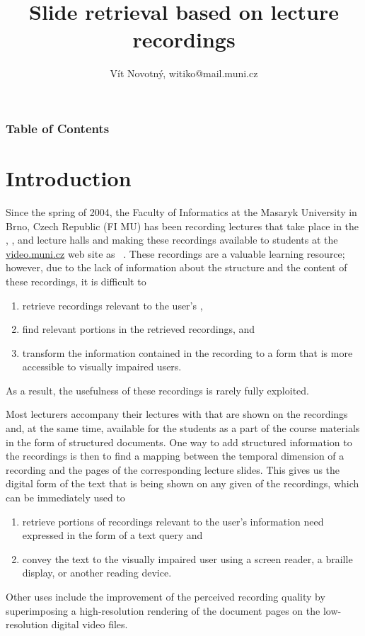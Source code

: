 \title[Lecture slide retrieval]{Slide retrieval based on lecture recordings}
\author[V.\,Novotný]{Vít Novotný, witiko@mail.muni.cz}
\subject{Project report}

\maketitle

\begin{frame}
\frametitle<presentation>{Table of Contents}
\tableofcontents
\end{frame}

\section{Introduction}
Since the spring of 2004, the Faculty of Informatics at the Masaryk University
in Brno, Czech Republic (FI MU) has been recording lectures that take place in
the , , and  lecture halls and making these
recordings available to students at the
\href{https://www.video.muni.cz}{video.muni.cz} web site as ~\cite{hladkaliska03lectures}. These recordings are a valuable learning
resource; however, due to the lack of information about the structure and the
content of these recordings, it is difficult to
\begin{enumerate}
\item retrieve recordings relevant to the user's ,
\item find relevant portions in the retrieved recordings, and
\item transform the information contained in the recording to a form that is more
  accessible to visually impaired users.
\end{enumerate}
As a result, the usefulness of these recordings is rarely fully exploited.

Most lecturers accompany their lectures with  that are shown
on the recordings and, at the same time, available for the students as a part of
the course materials in the form of structured  documents. One way to
add structured information to the recordings is then to find a mapping between the
temporal dimension of a recording and the pages of the corresponding lecture
slides. This gives us the digital form of the text that is being shown on any
given  of the recordings, which can be immediately used to
\begin{enumerate}
\item retrieve portions of recordings relevant to the user's information need
  expressed in the form of a text query and
\item convey the text to the visually impaired user using a screen reader, a
  braille display, or another reading device.
\end{enumerate}
Other uses include the improvement of the perceived recording quality by
superimposing a high-resolution rendering of the  document pages on
the low-resolution digital video files.

